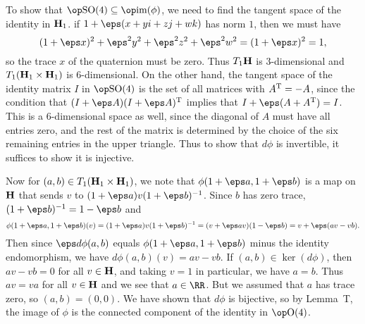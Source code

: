 To show that $\SO(4)\subseteq \im(\phi)$, we need to find the tangent space of the identity in ${\bf H}_1$.
if $1+\eps(x+yi+zj+wk)$ has norm $1$, then we must have
$$(1+\eps x)^2 + \eps^2 y^2 + \eps^2 z^2 + \eps^2 w^2 = (1+\eps x)^2 = 1,$$
so the trace $x$ of the quaternion must be zero. Thus $T_1{\bf H}$ is $3$-dimensional and $T_1({\bf H}_1\times {\bf H}_1)$
is $6$-dimensional. On the other hand, the tangent space of the identity matrix $I$ in $\SO(4)$
is the set of all matrices with $A^{\rm T} = -A$, since the condition that $(I+\eps A)(I+\eps A)^\T$
implies that $I+\eps(A+A^\T) = I$. This is a $6$-dimensional space as well, since the diagonal of $A$ must
have all entries zero, and the rest of the matrix is determined by the choice of the six remaining entries
in the upper triangle. Thus to show that $d\phi$ is invertible, it suffices to show it is injective.

Now for $(a,b)\in T_1({\bf H}_1\times {\bf H}_1)$, we note that $\phi(1+\eps a, 1+\eps b)$ is a map on ${\bf H}$
that sends $v$ to $(1+\eps a)v(1+\eps b)^{-1}$. Since $b$ has zero trace, $(1+\eps b)^{-1} = 1-\eps b$
and
$$\phi(1+\eps a, 1+\eps b)(v) = (1+\eps a)v(1+\eps b)^{-1} = (v+\eps av)(1-\eps b) = v + \eps(av-vb).$$
Then since $\eps d\phi(a,b)$ equals $\phi(1+\eps a, 1+\eps b)$ minus the identity endomorphism, we have
$d\phi(a,b)(v) = av-vb$. If $(a,b)\in \ker(d\phi)$, then $av-vb=0$ for all $v\in {\bf H}$, and taking $v=1$ in
particular, we have $a=b$. Thus $av=va$ for all $v\in {\bf H}$ and we see that $a\in \RR$. But we assumed that
$a$ has trace zero, so $(a,b) = (0,0)$. We have shown that $d\phi$ is bijective, so by Lemma~T, the
image of $\phi$ is the connected component of the identity in $\O(4)$.

